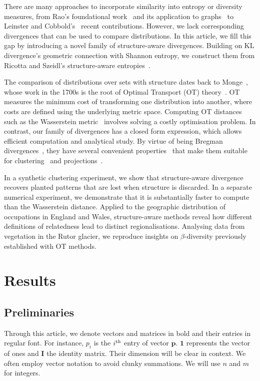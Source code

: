 \documentclass[aps,pre,floats,floatfix,superscriptaddress,twocolumn,final,10pt]{revtex4-2}
\theoremstyle{definition}
\renewcommand{\vec}[1]{\mathbf{#1}}
\begin{document}
There are many approaches to incorporate similarity into entropy or diversity measures, from Rao's foundational work~\cite{Rao1982} and its application to graphs~\cite{Devriendt2022} to Leinster and Cobbold's~\cite{Leinster2012} recent contributions. However, we lack corresponding divergences that can be used to compare distributions. In this article, we fill this gap by introducing a novel family of structure-aware divergences. Building on KL divergence's geometric connection with Shannon entropy, we construct them from Ricotta and Szeidl's structure-aware entropies~\cite{Ricotta2006}.

The comparison of distributions over sets with structure dates back to Monge~\cite{Monge1781}, whose work in the 1700s is the root of Optimal Transport (OT) theory~\cite{Villani2009}. OT measures the minimum cost of transforming one distribution into another, where costs are defined using the underlying metric space. Computing OT distances such as the Wasserstein metric~\cite{Kantorovich1939, Vaserten1969} involves solving a costly optimisation problem. 
In contrast, our family of divergences has a closed form expression, which allows efficient computation and analytical study. By virtue of being Bregman divergences~\cite{Bregman1967}, they have several convenient properties~\cite{Amari2016, Banerjee2004} that make them suitable for clustering~\cite{Banerjee2004} and projections~\cite{Dhillon2008}. 

In a synthetic clustering experiment, we show that structure-aware divergence recovers planted patterns that are lost when structure is discarded. In a separate numerical experiment, we demonstrate that it is substantially faster to compute than the Wasserstein distance. Applied to the geographic distribution of occupations in England and Wales, structure-aware methods reveal how different definitions of relatedness lead to distinct regionalisations. Analysing data from vegetation in the Rutor glacier, we reproduce insights on $\beta$-diversity previously established with OT methods.


\section{Results}
\subsection{Preliminaries}
Through this article, we denote vectors and matrices in bold and their entries in regular font. For instance, $p_i$ is the $i^\textnormal{th}$ entry of vector $\vec{p}$. $\vec{1}$ represents the vector of ones and $\vec{I}$ the identity matrix. Their dimension will be clear in context. We often employ vector notation to avoid clunky summations. We will use $n$ and $m$ for integers.
\end{document}
